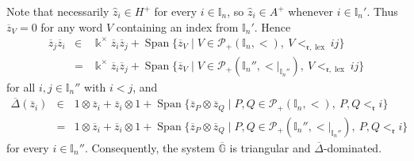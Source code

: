 \documentclass{article}
\makeatletter
\renewenvironment{proof}[1][\proofname]{\par
	\pushQED{\qed}%
	\normalfont \topsep6\p@\@plus6\p@\relax
	\trivlist
	\item[\hskip\labelsep
	\bfseries
	#1\@addpunct{.}]\ignorespaces
}{%
	\popQED\endtrivlist\@endpefalse
}
\theoremstyle{plain}
\theoremstyle{definition}
\numberwithin{equation}{section}
\DeclareMathOperator{\Span}{Span}
\DeclareMathOperator{\lex}{lex}
\newcommand{\PP}{\mathcal{P}}
\newcommand{\GG}{\mathbb{G}}
\newcommand{\II}{\mathbb{I}}
\newcommand{\rr}{\mathfrak{r}}
\makeatother
\begin{document}
\begin{proof}
		Note that necessarily $\hat{z}_{i} \in H^{+}$ for every $i\in \II_{n}$, so $\hat{z}_{i} \in A^{+}$ whenever $i\in \II_{n}'$. Thus $\overline{z}_{V}=0$ for any word $V$ containing an index from $\II_{n}'$. Hence
		\begin{eqnarray*}
			\overline{z}_{j}\overline{z}_{i} &\in& \Bbbk^{\times}\overline{z}_{i} \overline{z}_{j} + \Span\{\overline{z}_{V}\mid V\in \PP_{+}(\II_{n},<), ~  V<_{\rr,\lex} ij \} \\
			& = & \Bbbk^{\times} \overline{z}_{i} \overline{z}_{j} + \Span\{\overline{z}_{V}\mid V\in \PP_{+}(\II_{n}'',{<}|_{\II_{n}''}),  ~ V<_{\rr,\lex} ij \}
		\end{eqnarray*}
		for all $i,j \in \II_{n}''$ with $i< j$, and
		\begin{eqnarray*}
			\overline{\Delta}(\overline{z}_{i}) &\in&  1\otimes \overline{z}_{i} + \overline{z}_{i} \otimes 1 + \Span\{\overline{z}_{P}\otimes \overline{z}_{Q}\mid P,Q\in \PP_{+}(\II_{n}, <), ~ P, Q <_{\rr} i\} \\
			&=& 1\otimes \overline{z}_{i} + \overline{z}_{i} \otimes 1 + \Span\{\overline{z}_{P}\otimes \overline{z}_{Q}\mid P,Q\in \PP_{+}(\II_{n}'',{<}|_{\II_{n}''}), ~ P, Q <_{\rr} i\}
		\end{eqnarray*}
		for every $i\in \II_{n}''$.
		Consequently, the system $\overline{\GG}$ is triangular and $\overline{\Delta}$-dominated.
		

\end{proof}
\end{document}
